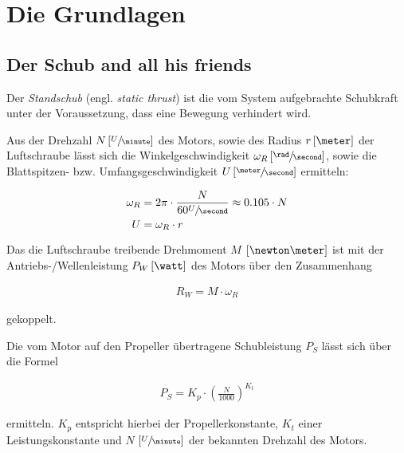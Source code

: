\chapter{Die Grundlagen}

\section{Der Schub and all his friends}

Der \emph{Standschub} (engl. \emph{static thrust}) ist die vom System aufgebrachte Schubkraft unter der Voraussetzung, dass eine Bewegung verhindert wird.

\bigbreak

Aus der Drehzahl $N \left[\sfrac{U}{\minute}\right]$ des Motors, sowie des Radius $r \left[\meter\right]$ der Luftschraube lässt sich die Winkelgeschwindigkeit $\omega_R \left[\sfrac{\rad}{\second}\right]$, sowie die Blattspitzen- bzw. Umfangsgeschwindigkeit $U \left[\sfrac{\meter}{\second}\right]$ ermitteln:

\begin{align}
	\omega_R &= 2\pi \cdot \frac{N}{60 \sfrac{U}{\second}} \approx 0.105 \cdot N \\
	U &= \omega_R \cdot r
\end{align}

\bigbreak

Das die Luftschraube treibende Drehmoment $M$ $\left[\newton\meter\right]$ ist mit der Antriebs-/Wellenleistung $P_W \left[\watt\right]$ des Motors über den Zusammenhang

\begin{align}
	R_W = M \cdot \omega_R
\end{align}

gekoppelt.

\bigbreak {}

Die vom Motor auf den Propeller übertragene Schubleistung $P_S$ lässt sich über die Formel

\begin{align}
	P_S = K_p \cdot \left(\frac{N}{1000}\right)^{K_t}
\end{align}

ermitteln. $K_p$ entspricht hierbei der Propellerkonstante, $K_t$ einer Leistungskonstante  und $N$ $\left[\sfrac{U}{\minute}\right]$ der bekannten Drehzahl des Motors.

